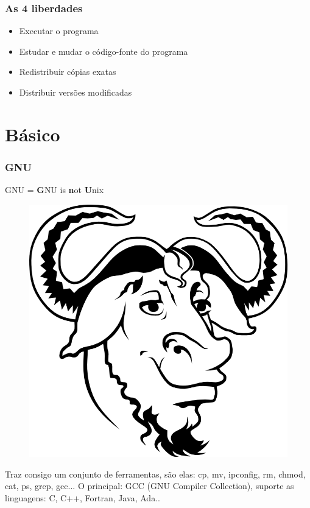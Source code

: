 \documentclass{beamer}
\begin{document}
\begin{frame}
\frametitle{As 4 liberdades}
    \begin{itemize}
        \item Executar o programa
        \item Estudar e mudar o código-fonte do programa
        \item Redistribuir cópias exatas
        \item Distribuir versões modificadas
    \end{itemize}
\end{frame}



\section{Básico}

\begin{frame}
    \frametitle{GNU}
    \centerline{GNU = \textbf{G}NU is \textbf{n}ot \textbf{U}nix}

    \begin{figure}
        \includegraphics[width=.2\linewidth]{gnulogo.png}
    \end{figure}

    Traz consigo um conjunto de ferramentas, são elas: cp, mv, ipconfig, rm, chmod, cat, ps, grep, gcc...
    \newline
    \newline
    O principal: GCC (GNU Compiler Collection), suporte as linguagens: C, C++, Fortran, Java, Ada..
\end{frame}
\end{document}
